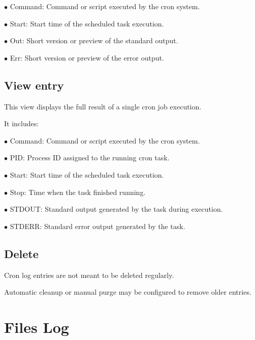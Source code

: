 \documentclass[a4paper]{article}
\begin{document}
\begin{compactitem}
\item[\color{myblue}$\bullet$] Command: Command or script executed by the cron system.
\item[\color{myblue}$\bullet$] Start: Start time of the scheduled task execution.
\item[\color{myblue}$\bullet$] Out: Short version or preview of the standard output.
\item[\color{myblue}$\bullet$] Err: Short version or preview of the error output.
\end{compactitem}

\hypertarget{toc14}{}
\subsection{View entry}

This view displays the full result of a single cron job execution.

It includes:

\begin{compactitem}
\item[\color{myblue}$\bullet$] Command: Command or script executed by the cron system.
\item[\color{myblue}$\bullet$] PID: Process ID assigned to the running cron task.
\item[\color{myblue}$\bullet$] Start: Start time of the scheduled task execution.
\item[\color{myblue}$\bullet$] Stop: Time when the task finished running.
\item[\color{myblue}$\bullet$] STDOUT: Standard output generated by the task during execution.
\item[\color{myblue}$\bullet$] STDERR: Standard error output generated by the task.
\end{compactitem}

\hypertarget{toc15}{}
\subsection{Delete}

Cron log entries are not meant to be deleted regularly.

Automatic cleanup or manual purge may be configured to remove older entries.


\hypertarget{toc16}{}
\section{Files Log}
\end{document}
